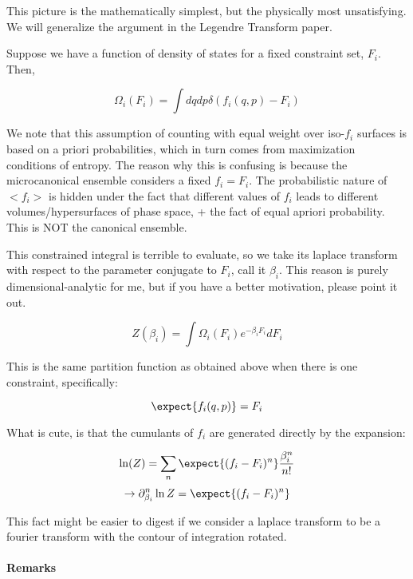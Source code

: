 This picture is the mathematically simplest, but the physically most unsatisfying.  We will generalize the argument in the Legendre Transform paper. 

Suppose we have a function of density of states for a fixed constraint set, $F_i$.  Then,

$$\Omega_i(F_i)= \int dqdp  \delta(f_i(q,p)- F_i)$$

We note that this assumption of counting with equal weight over iso-$f_i$ surfaces is based on a priori probabilities, which in turn comes from maximization conditions of entropy.  The reason why this is confusing is because the microcanonical ensemble considers a fixed $f_i= F_i$.  The probabilistic nature of $<f_i>$ is hidden under the fact that different values of $f_i$ leads to different volumes/hypersurfaces of phase space, + the fact of equal apriori probability. This is NOT the canonical ensemble.

This constrained integral is terrible to evaluate, so we take its laplace transform with respect to the parameter conjugate to $F_i$, call it $\beta_i$. This reason is purely dimensional-analytic for me, but if you have a better motivation, please point it out.

$$Z(\beta_i) = \int \Omega_i(F_i) e^{- \beta_i F_i} dF_i$$

This is the same partition function as obtained above when there is one constraint, specifically:

$$\expect{f_i (q,p)}= F_i$$

What is cute, is that the cumulants of $f_i$ are generated directly by the expansion:

$$\ln(Z)= \sum_n\expect{(f_i- F_i)^n} \frac{\beta_i^n}{n!}$$
$$\rightarrow \partial_{\beta_i}^n \ln Z = \expect{(f_i- F_i)^n}$$

This fact might be easier to digest if we consider a laplace transform to be a fourier transform with the contour of integration rotated.

\paragraph{Remarks}

